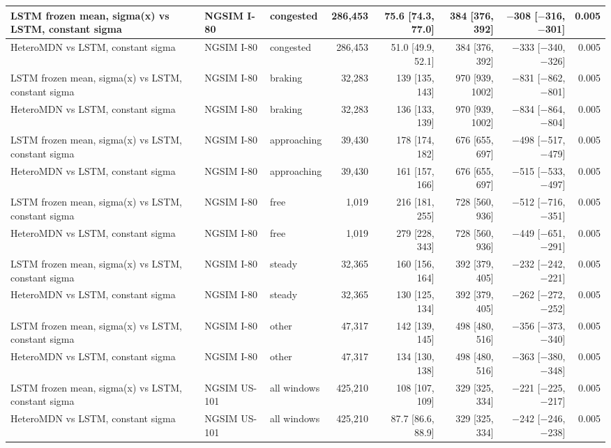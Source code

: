 \begin{longtable}{lllrrrrr}
\midrule
LSTM frozen mean, sigma(x) vs LSTM, constant sigma & NGSIM I-80 & congested & 286,453 & 75.6 [74.3, 77.0] & 384 [376, 392] & $-$308 [$-$316, $-$301] & 0.005 \\
\midrule
HeteroMDN vs LSTM, constant sigma & NGSIM I-80 & congested & 286,453 & 51.0 [49.9, 52.1] & 384 [376, 392] & $-$333 [$-$340, $-$326] & 0.005 \\
\midrule
LSTM frozen mean, sigma(x) vs LSTM, constant sigma & NGSIM I-80 & braking & 32,283 & 139 [135, 143] & 970 [939, 1002] & $-$831 [$-$862, $-$801] & 0.005 \\
\midrule
HeteroMDN vs LSTM, constant sigma & NGSIM I-80 & braking & 32,283 & 136 [133, 139] & 970 [939, 1002] & $-$834 [$-$864, $-$804] & 0.005 \\
\midrule
LSTM frozen mean, sigma(x) vs LSTM, constant sigma & NGSIM I-80 & approaching & 39,430 & 178 [174, 182] & 676 [655, 697] & $-$498 [$-$517, $-$479] & 0.005 \\
\midrule
HeteroMDN vs LSTM, constant sigma & NGSIM I-80 & approaching & 39,430 & 161 [157, 166] & 676 [655, 697] & $-$515 [$-$533, $-$497] & 0.005 \\
\midrule
LSTM frozen mean, sigma(x) vs LSTM, constant sigma & NGSIM I-80 & free & 1,019 & 216 [181, 255] & 728 [560, 936] & $-$512 [$-$716, $-$351] & 0.005 \\
\midrule
HeteroMDN vs LSTM, constant sigma & NGSIM I-80 & free & 1,019 & 279 [228, 343] & 728 [560, 936] & $-$449 [$-$651, $-$291] & 0.005 \\
\midrule
LSTM frozen mean, sigma(x) vs LSTM, constant sigma & NGSIM I-80 & steady & 32,365 & 160 [156, 164] & 392 [379, 405] & $-$232 [$-$242, $-$221] & 0.005 \\
\midrule
HeteroMDN vs LSTM, constant sigma & NGSIM I-80 & steady & 32,365 & 130 [125, 134] & 392 [379, 405] & $-$262 [$-$272, $-$252] & 0.005 \\
\midrule
LSTM frozen mean, sigma(x) vs LSTM, constant sigma & NGSIM I-80 & other & 47,317 & 142 [139, 145] & 498 [480, 516] & $-$356 [$-$373, $-$340] & 0.005 \\
\midrule
HeteroMDN vs LSTM, constant sigma & NGSIM I-80 & other & 47,317 & 134 [130, 138] & 498 [480, 516] & $-$363 [$-$380, $-$348] & 0.005 \\
\midrule
LSTM frozen mean, sigma(x) vs LSTM, constant sigma & NGSIM US-101 & all windows & 425,210 & 108 [107, 109] & 329 [325, 334] & $-$221 [$-$225, $-$217] & 0.005 \\
\midrule
HeteroMDN vs LSTM, constant sigma & NGSIM US-101 & all windows & 425,210 & 87.7 [86.6, 88.9] & 329 [325, 334] & $-$242 [$-$246, $-$238] & 0.005 \\

\end{longtable}
